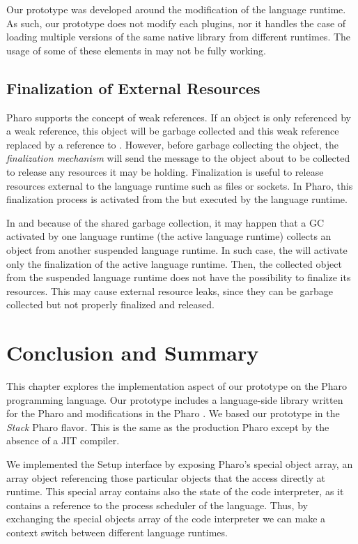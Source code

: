Our prototype was developed around the modification of the language runtime. As such, our \Vtt prototype does not modify each \VM plugins, nor it handles the case of loading multiple versions of the same native library from different runtimes. The usage of some of these elements in \Vtt may not be fully working.

\subsection{Finalization of External Resources}

Pharo \VM supports the concept of weak references. If an object is only referenced by a weak reference, this object will be garbage collected and this weak reference replaced by a reference to . However, before garbage collecting the object, the \emph{finalization mechanism} will send the  message to the object about to be collected to release any resources it may be holding. Finalization is useful to release resources external to the language runtime such as files or sockets. In Pharo, this finalization process is activated from the \VM but executed by the language runtime.

In \Vtt and because of the shared garbage collection, it may happen that a GC activated by one language runtime (the active language runtime) collects an object from another suspended language runtime. In such case, the \VM will activate only the finalization of the active language runtime. Then, the collected object from the suspended language runtime does not have the possibility to finalize its resources. This may cause external resource leaks, since they can be garbage collected but not properly finalized and released.

\section{Conclusion and Summary}

This chapter explores the implementation aspect of our \Vtt prototype on the Pharo programming language. Our prototype includes a language-side library written for the Pharo and modifications in the Pharo \VM. We based our prototype in the \emph{Stack} Pharo \VM flavor. This \VM is the same as the production Pharo \VM except by the absence of a JIT compiler.

We implemented the \VM Setup interface by exposing Pharo's special object array, an array object referencing those particular objects that the \VM access directly at runtime. This special array contains also the state of the code interpreter, as it contains a reference to the process scheduler of the language. Thus, by exchanging the special objects array of the \VM code interpreter we can make a context switch between different language runtimes.

